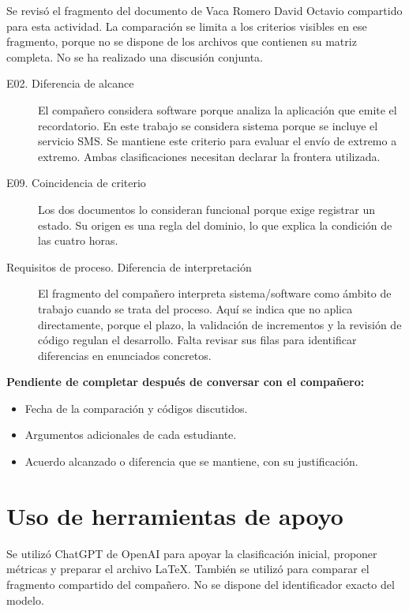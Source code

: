 \documentclass[11pt,a4paper]{article}
\begin{document}
Se revisó el fragmento del documento de Vaca Romero David Octavio
compartido para esta actividad. La comparación se limita a los
criterios visibles en ese fragmento, porque no se dispone de los
archivos que contienen su matriz completa.
No se ha realizado una discusión conjunta.

\begin{description}

\item[E02. Diferencia de alcance]
El compañero considera software porque analiza la aplicación que
emite el recordatorio. En este trabajo se considera sistema porque
se incluye el servicio SMS. Se mantiene este criterio para evaluar
el envío de extremo a extremo. Ambas clasificaciones necesitan
declarar la frontera utilizada.

\item[E09. Coincidencia de criterio]
Los dos documentos lo consideran funcional porque exige registrar
un estado. Su origen es una regla del dominio, lo que explica
la condición de las cuatro horas.

\item[Requisitos de proceso. Diferencia de interpretación]
El fragmento del compañero interpreta sistema/software como ámbito
de trabajo cuando se trata del proceso. Aquí se indica que no
aplica directamente, porque el plazo, la validación de incrementos
y la revisión de código regulan el desarrollo. Falta revisar sus
filas para identificar diferencias en enunciados concretos.

\end{description}

\textbf{Pendiente de completar después de conversar con el compañero:}

\begin{itemize}
    \item Fecha de la comparación y códigos discutidos.
    \item Argumentos adicionales de cada estudiante.
    \item Acuerdo alcanzado o diferencia que se mantiene,
    con su justificación.
\end{itemize}

\section{Uso de herramientas de apoyo}

Se utilizó ChatGPT de OpenAI para apoyar la clasificación inicial,
proponer métricas y preparar el archivo LaTeX. También se utilizó
para comparar el fragmento compartido del compañero.
No se dispone del identificador exacto del modelo.
\end{document}
